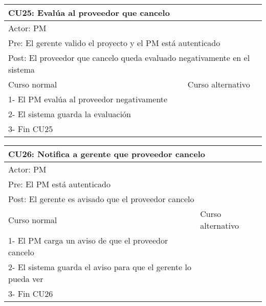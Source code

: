 \begin{table}[H]
  \begin{adjustbox}{max width = \textwidth}
  \begin{tabular}{|l|l|}
    \hline
    \multicolumn{2}{|l|}{CU25: Evalúa al proveedor que cancelo} \\\hline
    \multicolumn{2}{|l|}{Actor: PM} \\\hline
    \multicolumn{2}{|l|}{Pre: El gerente valido el proyecto y el PM está autenticado} \\\hline
    \multicolumn{2}{|l|}{Post: El proveedor que cancelo queda evaluado negativamente en el sistema} \\\hline
     Curso normal & Curso alternativo\\ \hline
     1- El PM evalúa al proveedor negativamente & \\ \hline
  	 2- El sistema guarda la evaluación & \\ \hline
     3- Fin CU25 & \\ \hline
 \end{tabular}
  \end{adjustbox}
\end{table}

\begin{table}[H]
  \begin{adjustbox}{max width = \textwidth}
  \begin{tabular}{|l|l|}
    \hline
    \multicolumn{2}{|l|}{CU26: Notifica a gerente que proveedor cancelo} \\\hline
    \multicolumn{2}{|l|}{Actor: PM} \\\hline
    \multicolumn{2}{|l|}{Pre: El PM está autenticado} \\\hline
    \multicolumn{2}{|l|}{Post: El gerente es avisado que el proveedor cancelo} \\\hline
     Curso normal & Curso alternativo\\ \hline
     1- El PM carga un aviso de que el proveedor cancelo & \\ \hline
  	 2- El sistema guarda el aviso para que el gerente lo pueda ver & \\ \hline
     3- Fin CU26 & \\ \hline
 \end{tabular}
  \end{adjustbox}
\end{table}


